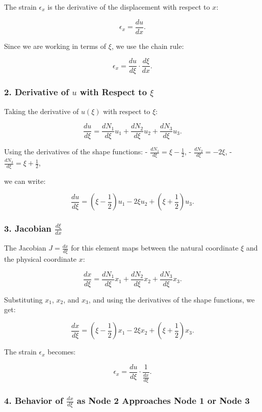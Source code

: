 \documentclass{article}
\begin{document}
The strain \( \epsilon_x \) is the derivative of the displacement with respect to \( x \):

\[
\epsilon_x = \frac{du}{dx}.
\]

Since we are working in terms of \( \xi \), we use the chain rule:

\[
\epsilon_x = \frac{du}{d\xi} \cdot \frac{d\xi}{dx}.
\]

\subsubsection*{2. Derivative of \( u \) with Respect to \( \xi \)}

Taking the derivative of \( u(\xi) \) with respect to \( \xi \):

\[
\frac{du}{d\xi} = \frac{dN_1}{d\xi} u_1 + \frac{dN_2}{d\xi} u_2 + \frac{dN_3}{d\xi} u_3.
\]

Using the derivatives of the shape functions:
- \( \frac{dN_1}{d\xi} = \xi - \frac{1}{2} \),
- \( \frac{dN_2}{d\xi} = -2\xi \),
- \( \frac{dN_3}{d\xi} = \xi + \frac{1}{2} \),

we can write:

\[
\frac{du}{d\xi} = \left( \xi - \frac{1}{2} \right) u_1 - 2\xi u_2 + \left( \xi + \frac{1}{2} \right) u_3.
\]

\subsubsection*{3. Jacobian \( \frac{d\xi}{dx} \)}

The Jacobian \( J = \frac{dx}{d\xi} \) for this element maps between the natural coordinate \( \xi \) and the physical coordinate \( x \):

\[
\frac{dx}{d\xi} = \frac{dN_1}{d\xi} x_1 + \frac{dN_2}{d\xi} x_2 + \frac{dN_3}{d\xi} x_3.
\]

Substituting \( x_1 \), \( x_2 \), and \( x_3 \), and using the derivatives of the shape functions, we get:

\[
\frac{dx}{d\xi} = \left( \xi - \frac{1}{2} \right) x_1 - 2\xi x_2 + \left( \xi + \frac{1}{2} \right) x_3.
\]

The strain \( \epsilon_x \) becomes:

\[
\epsilon_x = \frac{du}{d\xi} \cdot \frac{1}{\frac{dx}{d\xi}}.
\]

\subsubsection*{4. Behavior of \( \frac{dx}{d\xi} \) as Node 2 Approaches Node 1 or Node 3}
\end{document}
